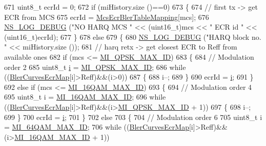 \begin{DoxyCode}
671   uint8\_t ecrId = 0;
672   \textcolor{keywordflow}{if} (miHistory.size ()==0)
673     \{
674       \textcolor{comment}{// first tx -> get ECR from MCS}
675       ecrId = \hyperlink{namespacens3_ad41f52d74f41546bde1a5d00c1eed016}{McsEcrBlerTableMapping}[mcs];
676       \hyperlink{group__logging_ga413f1886406d49f59a6a0a89b77b4d0a}{NS\_LOG\_DEBUG} (\textcolor{stringliteral}{"NO HARQ MCS "} << (uint16\_t)mcs << \textcolor{stringliteral}{" ECR id "} << (uint16\_t)ecrId);
677     \}
678   \textcolor{keywordflow}{else}
679     \{
680       \hyperlink{group__logging_ga413f1886406d49f59a6a0a89b77b4d0a}{NS\_LOG\_DEBUG} (\textcolor{stringliteral}{"HARQ block no. "} << miHistory.size ());
681       \textcolor{comment}{// harq retx -> get closest ECR to Reff from available ones}
682       \textcolor{keywordflow}{if} (mcs <= \hyperlink{namespacens3_a1840b801e1da3fdf41acd19d0d69b364}{MI\_QPSK\_MAX\_ID})
683         \{
684           \textcolor{comment}{// Modulation order 2}
685           uint8\_t \hyperlink{bernuolliDistribution_8m_a6f6ccfcf58b31cb6412107d9d5281426}{i} = \hyperlink{namespacens3_a1840b801e1da3fdf41acd19d0d69b364}{MI\_QPSK\_MAX\_ID};
686           \textcolor{keywordflow}{while} ((\hyperlink{namespacens3_aea9df233b95c667ad4b2249bfb203f64}{BlerCurvesEcrMap}[i]>Reff)&&(i>0))
687             \{
688               i--;
689             \}
690           ecrId = \hyperlink{bernuolliDistribution_8m_a6f6ccfcf58b31cb6412107d9d5281426}{i};
691         \}
692       \textcolor{keywordflow}{else} \textcolor{keywordflow}{if} (mcs <= \hyperlink{namespacens3_ae747a3e135187138f53f61a9cbc17bb0}{MI\_16QAM\_MAX\_ID})
693         \{
694           \textcolor{comment}{// Modulation order 4}
695           uint8\_t i = \hyperlink{namespacens3_ae747a3e135187138f53f61a9cbc17bb0}{MI\_16QAM\_MAX\_ID};
696           \textcolor{keywordflow}{while} ((\hyperlink{namespacens3_aea9df233b95c667ad4b2249bfb203f64}{BlerCurvesEcrMap}[i]>Reff)&&(i>\hyperlink{namespacens3_a1840b801e1da3fdf41acd19d0d69b364}{MI\_QPSK\_MAX\_ID} + 1))
697             \{
698               i--;
699             \}
700           ecrId = \hyperlink{bernuolliDistribution_8m_a6f6ccfcf58b31cb6412107d9d5281426}{i};
701         \}
702       \textcolor{keywordflow}{else}
703         \{
704           \textcolor{comment}{// Modulation order 6}
705           uint8\_t i = \hyperlink{namespacens3_ad631b53e9b9bbd85d0cd82beb8f78123}{MI\_64QAM\_MAX\_ID};
706           \textcolor{keywordflow}{while} ((\hyperlink{namespacens3_aea9df233b95c667ad4b2249bfb203f64}{BlerCurvesEcrMap}[i]>Reff)&&(i>\hyperlink{namespacens3_ae747a3e135187138f53f61a9cbc17bb0}{MI\_16QAM\_MAX\_ID} + 1))

\end{DoxyCode}
